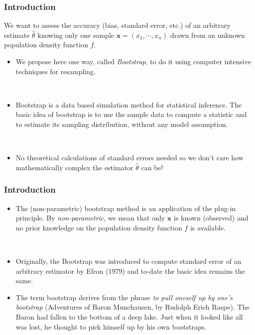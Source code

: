 \frame
{
\frametitle{Introduction}


 We want to assess the accuracy (bias, standard error, etc.) of an arbitrary estimate $\hat{\theta}$ knowing only one sample $\mathbf{x}=(x_1,\cdots,x_n)$ drawn from an unknown population  density function $f$.

\begin{itemize}
\item We propose here one way, called \textit{Bootstrap}, to do it using computer intensive techniques for resampling. 

\

\item Bootstrap is a data based simulation method for statistical inference. The basic idea of bootstrap is to use the sample data to compute a statistic and to estimate its sampling distribution, without any model assumption. 

\

\item No theoretical calculations of standard errors needed so we don't care how mathematically  complex the estimator $\hat{\theta}$ can be! 

 \end{itemize}



}

\frame
{
\frametitle{Introduction}


\begin{itemize}
\item The (non-parametric) bootstrap method is an application of the plug-in principle.   By \textit{non-parametric}, we mean that only $\mathbf{x}$ is known (observed) and no prior knowledge on the population density function $f$ is available.

\

\item Originally, the Bootstrap was introduced to compute standard error of an arbitrary estimator by  Efron (1979) and to-date the basic idea remains the same.
\

\item The term \alert{bootstrap} derives from the phrase \textit{to pull oneself up by one's bootstrap} (Adventures of Baron Munchausen, by Rudolph Erich Raspe). The Baron had fallen to the bottom of a deep lake. Just when it
looked like all was lost, he thought to pick himself up by his own
bootstraps.

\end{itemize}


}

